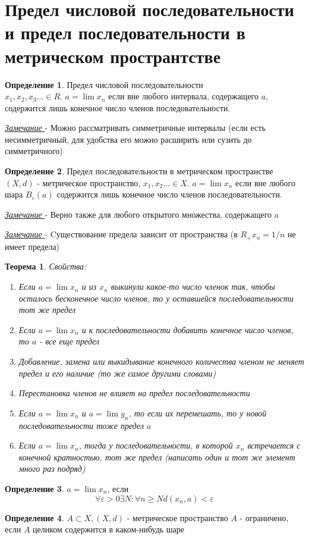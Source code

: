 \documentclass[12pt,letterpaper]{report}
\newtheorem*{theorem-non}{Теорема}
\theoremstyle{definition}
\newtheorem*{conj}{Определение}
\newcommand{\notice}{\underline{\textit{Замечание }}}
\begin{document}
\section{Предел числовой последовательности и предел последовательности в метрическом пространтстве}

    \begin{conj}
        Предел числовой последовательности \\
        $x_1, x_2, x_3 ... \in R$. $a=\lim x_n$ если вне любого интервала, содержащего $a$, содержится лишь конечное число членов последовательности.
    \end{conj}
    \notice -
    Можно рассматривать симметричные интервалы (если есть несимметричный, для удобства его можно расширить или сузить до симметричного)
    
    \begin{conj}
        Предел последовательности в метрическом пространстве
        $(X, d)$ - метрическое пространство, $x_1, x_2 ... \in X$. $a=\lim x_n$ если вне любого шара $B_\varepsilon (a)$ содержится лишь конечное число членов последовательности.
    \end{conj}
    
    \notice -
    Верно также для любого открытого множества, содержащего $a$
    
    \notice -
    Cуществование предела зависит от пространства (в $R_+ x_n = 1/n$ не имеет предела)
    
    \begin{theorem-non}
        Свойства:
        \begin{enumerate}
            \item Если $a=\lim x_n$ и из $x_n$ выкинули какое-то число членок так, чтобы осталось бесконечное число членов, то у оставшейся последовательности тот же предел
            \item Если $a=\lim x_n$ и к последовательности добавить конечное число членов, то $a$ - все еще предел
            \item Добавление, замена или выкидывание конечного количества членом не меняет предел и его наличие (то же самое другими словами)
            \item Перестановка членов не влияет на предел последовательности
            \item Если $a=\lim x_n$ и $a=\lim y_n$, то если их перемешать, то у новой последовательности тоже предел $a$
            \item Если $a=\lim x_n$, тогда у последовательности, в которой $x_n$ встречается с конечной кратностью, тот же предел (написать один и тот же элемент много раз подряд)
        \end{enumerate}
    \end{theorem-non}
    \begin{conj}
        $a=\lim x_n$, если
    \[ \forall \varepsilon>0 \exists N : \forall n\geq N d(x_n, a)<\varepsilon\]
    \end{conj}
    \begin{conj}
        $A \subset X, (X, d)$ - метрическое пространство
        $A$ - ограничено, если $A$ целиком содержится в каком-нибудь шаре
    \end{conj}
    
\end{document}
